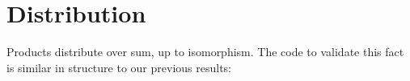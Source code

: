 \begin{fence}
\begin{code}
\AgdaSpace{}%
\AgdaSymbol{=}\AgdaSpace{}%
\AgdaSpace{}%
\AgdaSpace{}%
\AgdaSpace{}%
\AgdaSpace{}%
\AgdaSpace{}%
\AgdaSpace{}%
\AgdaSpace{}%
\AgdaSpace{}%
\AgdaSymbol{(}\AgdaSpace{}%
\AgdaSymbol{)}\AgdaSpace{}%
\AgdaSymbol{\}}\AgdaSpace{}%
\AgdaSymbol{\}}\<%
\\
%
\>[4]\AgdaSymbol{;}\AgdaSpace{}%
\AgdaSpace{}%
\AgdaSymbol{=}\AgdaSpace{}%
\AgdaSpace{}%
\AgdaSpace{}%
\AgdaSpace{}%
\AgdaOperator{\AgdaInductiveConstructor{,}}\AgdaSpace{}%
\AgdaSpace{}%
\AgdaSpace{}%
\AgdaSpace{}%
\AgdaSpace{}%
\AgdaSymbol{\}}\<%
\\
%
\>[4]\AgdaSymbol{\}}\<%
\end{code}
\end{fence}

\hypertarget{distribution}{%
\section{Distribution}\label{distribution}}

Products distribute over sum, up to isomorphism. The code to validate
this fact is similar in structure to our previous results:

